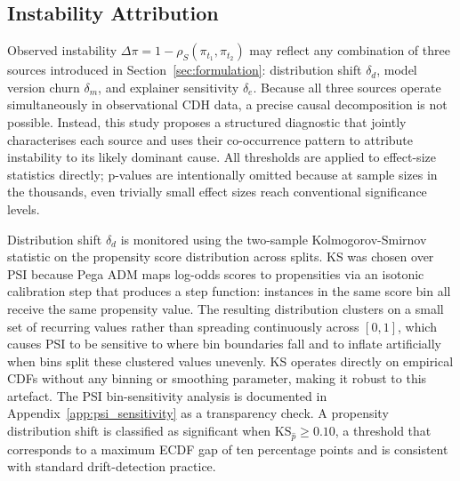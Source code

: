 \documentclass[oneside]{memoir} %
\begin{document}
\subsection{Instability Attribution}

Observed instability $\Delta\pi = 1 - \rho_S(\pi_{t_1}, \pi_{t_2})$ may reflect any combination of three sources introduced in Section~\ref{sec:formulation}: distribution shift $\delta_d$, model version churn $\delta_m$, and explainer sensitivity $\delta_e$. Because all three sources operate simultaneously in observational CDH data, a precise causal decomposition is not possible. Instead, this study proposes a structured diagnostic that jointly characterises each source and uses their co-occurrence pattern to attribute instability to its likely dominant cause. All thresholds are applied to effect-size statistics directly; p-values are intentionally omitted because at sample sizes in the thousands, even trivially small effect sizes reach conventional significance levels.

Distribution shift $\delta_d$ is monitored using the two-sample Kolmogorov-Smirnov statistic on the propensity score distribution across splits. KS was chosen over PSI because Pega ADM maps log-odds scores to propensities via an isotonic calibration step that produces a step function: instances in the same score bin all receive the same propensity value. The resulting distribution clusters on a small set of recurring values rather than spreading continuously across $[0, 1]$, which causes PSI to be sensitive to where bin boundaries fall and to inflate artificially when bins split these clustered values unevenly. KS operates directly on empirical CDFs without any binning or smoothing parameter, making it robust to this artefact. The PSI bin-sensitivity analysis is documented in Appendix~\ref{app:psi_sensitivity} as a transparency check. A propensity distribution shift is classified as significant when $\text{KS}_{\hat{p}} \geq 0.10$, a threshold that corresponds to a maximum ECDF gap of ten percentage points and is consistent with standard drift-detection practice.
\end{document}
